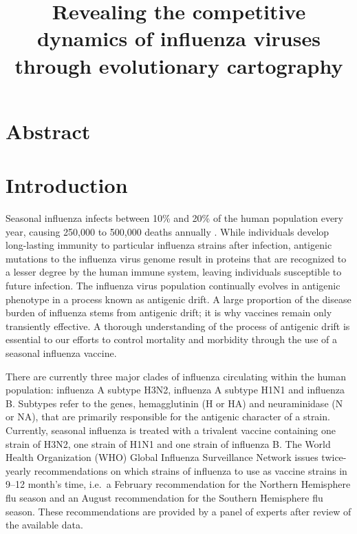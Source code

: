 \documentclass[11pt,oneside,letterpaper]{article}
\title{\vspace{1.0cm} \LARGE \bf Revealing the competitive dynamics of influenza viruses through evolutionary cartography}
\author{}
\date{}
\begin{document}
\maketitle



\section*{Abstract}

\section*{Introduction}

Seasonal influenza infects between 10\% and 20\% of the human population every year, causing 250,000 to 500,000 deaths annually \cite{flufactsheet}. 
While individuals develop long-lasting immunity to particular influenza strains after infection, antigenic mutations to the influenza virus genome result in proteins that are recognized to a lesser degree by the human immune system, leaving individuals susceptible to future infection. 
The influenza virus population continually evolves in antigenic phenotype in a process known as antigenic drift. 
A large proportion of the disease burden of influenza stems from antigenic drift; it is why vaccines remain only transiently effective. 
A thorough understanding of the process of antigenic drift is essential to our efforts to control mortality and morbidity through the use of a seasonal influenza vaccine.

There are currently three major clades of influenza circulating within the human population: influenza A subtype H3N2, influenza A subtype H1N1 and influenza B. 
Subtypes refer to the genes, hemagglutinin (H or HA) and neuraminidase (N or NA), that are primarily responsible for the antigenic character of a strain. 
Currently, seasonal influenza is treated with a trivalent vaccine containing one strain of H3N2, one strain of H1N1 and one strain of influenza B. 
The World Health Organization (WHO) Global Influenza Surveillance Network issues twice-yearly recommendations on which strains of influenza to use as vaccine strains in 9--12 month’s time, i.e.\ a February recommendation for the Northern Hemisphere flu season and an August recommendation for the Southern Hemisphere flu season. 
These recommendations are provided by a panel of experts after review of the available data.
\end{document}

